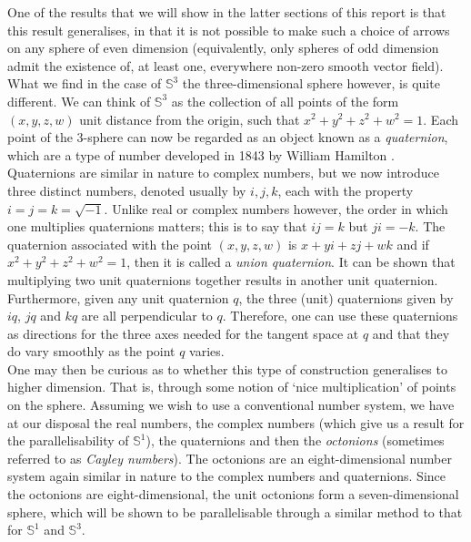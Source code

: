 \documentclass[12pt,a4paper]{article}
\numberwithin{equation}{section}
\theoremstyle{definition}
\theoremstyle{remark}
\begin{document}
One of the results that we will show in the latter sections of this report is that this result generalises, in that it is not possible to make such a choice of arrows on any sphere of even dimension (equivalently, only spheres of odd dimension admit the existence of, at least one, everywhere non-zero smooth vector field). 
What we find in the case of $\mathbb{S}^3$ the three-dimensional sphere however, is quite different. We can think of $\mathbb{S}^3$ as the collection of all points of the form $(x,y,z,w)$ unit distance from the origin, such that $x^2+y^2+z^2+w^2=1$. Each point of the 3-sphere can now be regarded as an object known as a \textit{quaternion}, which are a type of number developed in 1843 by William Hamilton \cite{hamilton1844ii}.\\

Quaternions are similar in nature to complex numbers, but we now introduce three distinct numbers, denoted usually by $i,j,k$, each with the property $i=j=k=\sqrt{-1}$. Unlike real or complex numbers however, the order in which one multiplies quaternions matters; this is to say that $ij=k$ but $ji=-k$. The quaternion associated with the point $(x,y,z,w)$ is $x+yi+zj+wk$ and if $x^2+y^2+z^2+w^2=1$, then it is called a \textit{union quaternion}.
It can be shown that multiplying two unit quaternions together results in another unit quaternion. Furthermore, given any unit quaternion $q$, the three (unit) quaternions given by $iq$, $jq$ and $kq$ are all perpendicular to $q$. Therefore, one can use these quaternions as directions for the three axes needed for the tangent space at $q$ and that they do vary smoothly as the point $q$ varies.\\

One may then be curious as to whether this type of construction generalises to higher dimension. That is, through some notion of `nice multiplication' of points on the sphere. Assuming we wish to use a conventional number system, we have at our disposal the real numbers, the complex numbers (which give us a result for the parallelisability of $\mathbb{S}^1$), the quaternions and then the \textit{octonions} (sometimes referred to as \textit{Cayley numbers}). The octonions are an eight-dimensional number system again similar in nature to the complex numbers and quaternions. Since the octonions are eight-dimensional, the unit octonions form a seven-dimensional sphere, which will be shown to be parallelisable through a similar method to that for $\mathbb{S}^1$ and $\mathbb{S}^3$.\\
 
\end{document}
